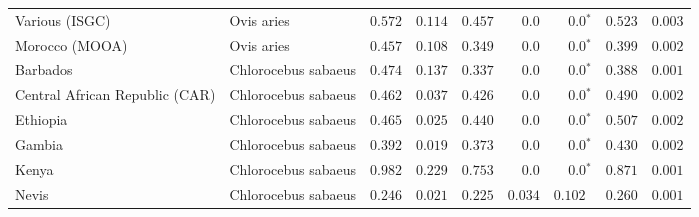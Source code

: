 \begin{center}
\begin{adjustbox}{width = 1\textwidth}
\begin{tabular}{|l|l|r|r|r|r|r|r|r|}
                 Various (ISGC) &           Ovis aries &                                        $ 0.572$ &                                           $ 0.114$ &                      $ 0.457$ &            $0.0$ &                  $\bm{0.0{^*}}$ &                                           $ 0.523$ &           $ 0.003$ \\
                 Morocco (MOOA) &           Ovis aries &                                        $ 0.457$ &                                           $ 0.108$ &                      $ 0.349$ &            $0.0$ &                  $\bm{0.0{^*}}$ &                                           $ 0.399$ &           $ 0.002$ \\
                       Barbados &  Chlorocebus sabaeus &                                        $ 0.474$ &                                           $ 0.137$ &                      $ 0.337$ &            $0.0$ &                  $\bm{0.0{^*}}$ &                                           $ 0.388$ &           $ 0.001$ \\
 Central African Republic (CAR) &  Chlorocebus sabaeus &                                        $ 0.462$ &                                           $ 0.037$ &                      $ 0.426$ &            $0.0$ &                  $\bm{0.0{^*}}$ &                                           $ 0.490$ &           $ 0.002$ \\
                       Ethiopia &  Chlorocebus sabaeus &                                        $ 0.465$ &                                           $ 0.025$ &                      $ 0.440$ &            $0.0$ &                  $\bm{0.0{^*}}$ &                                           $ 0.507$ &           $ 0.002$ \\
                         Gambia &  Chlorocebus sabaeus &                                        $ 0.392$ &                                           $ 0.019$ &                      $ 0.373$ &            $0.0$ &                  $\bm{0.0{^*}}$ &                                           $ 0.430$ &           $ 0.002$ \\
                          Kenya &  Chlorocebus sabaeus &                                        $ 0.982$ &                                           $ 0.229$ &                      $ 0.753$ &            $0.0$ &                  $\bm{0.0{^*}}$ &                                           $ 0.871$ &           $ 0.001$ \\
                          Nevis &  Chlorocebus sabaeus &                                        $ 0.246$ &                                           $ 0.021$ &                      $ 0.225$ &         $ 0.034$ &                      $ 0.102~~$ &                                           $ 0.260$ &           $ 0.001$ \\

\end{tabular}
\end{adjustbox}
\end{center}
